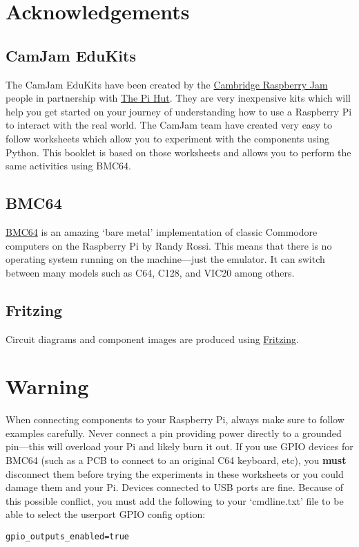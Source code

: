\begin{titlepage}
\section*{Acknowledgements}

\subsection*{CamJam EduKits}


The CamJam EduKits have been created by the \href{https://camjam.me/}{Cambridge Raspberry Jam} people in partnership with \href{https://thepihut.com/collections/camjam-edukit}{The Pi Hut}.  They are very inexpensive kits which will help you get started on your journey of understanding how to use a Raspberry Pi to interact with the real world.  The CamJam team have created very easy to follow worksheets which allow you to experiment with the components using Python.  This booklet is based on those worksheets and allows you to perform the same activities using BMC64.

\subsection*{BMC64}

\href{https://github.com/randyrossi/bmc64}{BMC64} is an amazing `bare metal' implementation of classic Commodore computers on the Raspberry Pi by Randy Rossi.  This means that there is no operating system running on the machine---just the emulator.  It can switch between many models such as C64, C128, and VIC20 among others.

\subsection*{Fritzing}

Circuit diagrams and component images are produced using \href{https://fritzing.org/}{Fritzing}.
\vfill
\section*{\color{red}Warning}

When connecting components to your Raspberry Pi, always make sure to follow examples carefully.  Never connect a pin providing power directly to a grounded pin---this will overload your Pi and likely burn it out.  If you use GPIO devices for BMC64 (such as a PCB to connect to an original C64 keyboard, etc), you \textbf{must} disconnect them before trying the experiments in these worksheets or you could damage them and your Pi.  Devices connected to USB ports are fine.  Because of this possible conflict, you must add the following to your `cmdline.txt' file to be able to select the userport GPIO config option:
\begin{verbatim}
gpio_outputs_enabled=true
\end{verbatim}

\end{titlepage}

